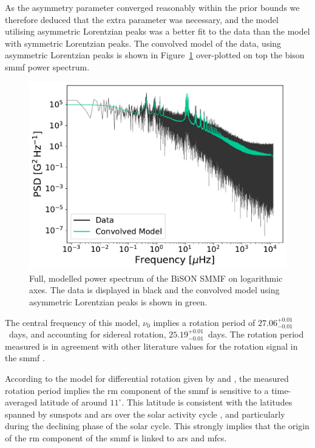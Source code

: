 As the asymmetry parameter converged reasonably within the prior bounds we therefore deduced that the extra parameter was necessary, and the model utilising asymmetric Lorentzian peaks was a better fit to the data than the model with symmetric Lorentzian peaks. The convolved model of the data, using asymmetric Lorentzian peaks is shown in Figure~\ref{fig:BiSON_PSD_fit} over-plotted on top the \gls{bison} \gls{smmf} power spectrum.


\begin{figure}[ht!]
	\centering
	\includegraphics[width=\columnwidth]{BiSON_PSD_model.pdf}
	\caption{Full, modelled power spectrum of the BiSON SMMF on logarithmic axes. The data is displayed in black and the convolved model using asymmetric Lorentzian peaks is shown in green.}
	\label{fig:BiSON_PSD_fit}
\end{figure}


The central frequency of this model, $\nu_0$ implies a rotation period of $27.06^{+0.01}_{-0.01}$~days, and accounting for sidereal rotation, $25.19^{+0.01}_{-0.01}$~days. The rotation period measured is in agreement with other literature values for the rotation signal in the \gls{smmf} \citep{chaplin_studies_2003, xie_temporal_2017}. 

According to the model for differential rotation given by \citet{snodgrass_magnetic_1983} and \citet{brown_inferring_1989}, the measured rotation period implies the \gls{rm} component of the \gls{smmf} is sensitive to a time-averaged latitude of around $11^{\circ}$. This latitude is consistent with the latitudes spanned by sunspots and \glspl{ar} over the solar activity cycle \citep{maunder_note_1904, mcintosh_deciphering_2014, thomas_asteroseismic_2019}, and particularly during the declining phase of the solar cycle. This strongly implies that the origin of the \gls{rm} component of the \gls{smmf} is linked to \glspl{ar} and \glspl{mfc}.

